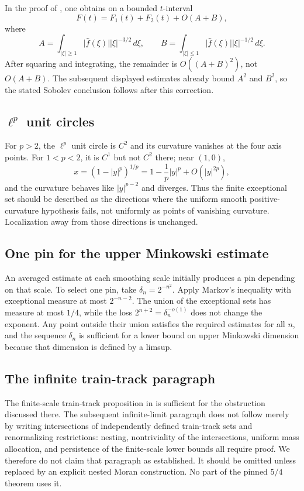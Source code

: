 \documentclass[11pt,letterpaper]{amsart}
\newcommand{\wh}{\widehat}
\newcommand{\abs}[1]{\lvert#1\rvert}
\begin{document}
In the proof of \cite[Lemma 7.5]{GIOW}, one obtains on a bounded $t$-interval
\[
 F(t)=F_1(t)+F_2(t)+O(A+B),
\]
where
\[
 A=\int_{\abs{\xi}\ge1}\abs{\wh f(\xi)}\abs{\xi}^{-3/2}\,d\xi,
 \qquad
 B=\int_{\abs{\xi}\le1}\abs{\wh f(\xi)}\abs{\xi}^{-1/2}\,d\xi.
\]
After squaring and integrating, the remainder is $O((A+B)^2)$, not $O(A+B)$. The subsequent displayed estimates already bound $A^2$ and $B^2$, so the stated Sobolev conclusion follows after this correction.

\subsection{\texorpdfstring{$\ell^p$}{lp} unit circles}

For $p>2$, the $\ell^p$ unit circle is $C^2$ and its curvature vanishes at the four axis points. For $1<p<2$, it is $C^1$ but not $C^2$ there; near $(1,0)$,
\[
 x=(1-\abs{y}^p)^{1/p}=1-\frac1p\abs{y}^p+O(\abs{y}^{2p}),
\]
and the curvature behaves like $\abs{y}^{p-2}$ and diverges. Thus the finite exceptional set should be described as the directions where the uniform smooth positive-curvature hypothesis fails, not uniformly as points of vanishing curvature. Localization away from those directions is unchanged.

\subsection{One pin for the upper Minkowski estimate}

An averaged estimate at each smoothing scale initially produces a pin depending on that scale. To select one pin, take $\delta_n=2^{-n^2}$. Apply Markov's inequality with exceptional measure at most $2^{-n-2}$. The union of the exceptional sets has measure at most $1/4$, while the loss $2^{n+2}=\delta_n^{-o(1)}$ does not change the exponent. Any point outside their union satisfies the required estimates for all $n$, and the sequence $\delta_n$ is sufficient for a lower bound on upper Minkowski dimension because that dimension is defined by a limsup.

\subsection{The infinite train-track paragraph}

The finite-scale train-track proposition in \cite[Section 6]{GIOW} is sufficient for the obstruction discussed there. The subsequent infinite-limit paragraph does not follow merely by writing intersections of independently defined train-track sets and renormalizing restrictions: nesting, nontriviality of the intersections, uniform mass allocation, and persistence of the finite-scale lower bounds all require proof. We therefore do not claim that paragraph as established. It should be omitted unless replaced by an explicit nested Moran construction. No part of the pinned $5/4$ theorem uses it.
\end{document}
